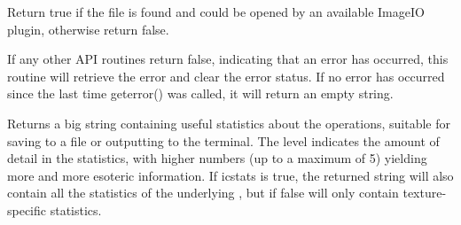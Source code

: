 
Return true if the file is found and could be opened by an
available ImageIO plugin, otherwise return false.

\apiend


If any other API 
routines return {\cf false}, indicating that an
error has occurred, this routine will retrieve the error and clear
the error status.  If no error has occurred since the last time
{\cf geterror()} was called, it will return an empty string.
\apiend

Returns a big string containing useful statistics about the \ImageCache
operations, suitable for saving to a file or outputting to the terminal.
The {\cf level} indicates the amount of detail in the statistics,
with higher numbers (up to a maximum of 5) yielding more and more
esoteric information.  If {\cf icstats} is true, the returned string
will also contain all the statistics of the underlying \ImageCache,
but if false will only contain texture-specific statistics.
\apiend


\chapwidthend
